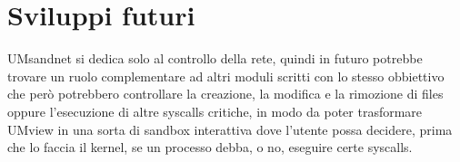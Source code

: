 \section{Sviluppi futuri}
UMsandnet si dedica solo al controllo della rete, quindi in futuro potrebbe trovare un ruolo complementare ad altri moduli scritti con lo stesso obbiettivo che però potrebbero controllare la creazione, la modifica e la rimozione di files oppure l'esecuzione di altre syscalls critiche, in modo da poter trasformare UMview in una sorta di sandbox interattiva dove l'utente possa decidere, prima che lo faccia il kernel, se un processo debba, o no, eseguire certe syscalls.